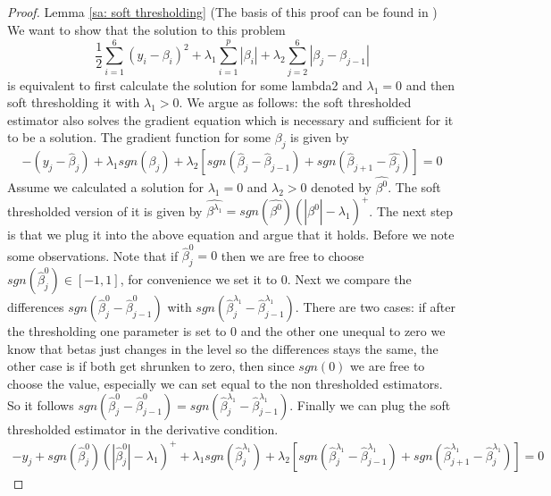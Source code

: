 \documentclass{article}
\theoremstyle{definition}
\begin{document}
\subsection{}

\begin{proof} Lemma \ref{sa: soft thresholding} (The basis of this proof can be found in \citep{friedman2007pathwise})
	We want  to show that the solution to this problem 
	\begin{equation}
	\frac{1}{2}  \sum_{i=1}^{6}(y_{i}-\beta_i)^2+\lambda_1\sum_{i=1}^p|\beta_i| + \lambda_2 \sum_{j=2}^6|\beta_j- \beta_{j-1} |
	\end{equation} is equivalent to first calculate the solution for some lambda2  and $\lambda_1 =0$ and then soft thresholding it with $\lambda_1>0$. We argue as follows: the soft thresholded estimator also solves the gradient equation which is necessary and sufficient for it to be a solution. The gradient function for some $\beta_j$ is given by
	\begin{equation}
	-(y_j-\hat{\beta}_j)+\lambda_1 sgn(\beta_j)+\lambda_2 [sgn(\hat{\beta}_j-\hat{\beta}_{j-1})+sgn(\hat{\beta}_{j+1}-\hat{\beta_j})]=0
	\end{equation}
	Assume we calculated a solution for $\lambda_1=0$ and $\lambda_2 > 0$ denoted by $\hat{\beta^0}$. The soft thresholded version of it is given by $\hat{\beta^{\lambda_1}}=sgn(\hat{\beta^0})(|\hat{\beta^0}|-\lambda_1)^{\text{+}}$. The next step is that we plug it into the above equation and argue that it holds. Before we note some observations. Note that if $\hat{\beta}^0_j=0$ then we are free to choose $sgn(\hat{\beta}^0_j) \in [-1,1]$, for convenience we set it to 0. Next we compare the differences $sgn(\hat{\beta}_j^0-\hat{\beta}_{j-1}^0)$ with $sgn(\hat{\beta}_j^{\lambda_1}-\hat{\beta}_{j-1}^{\lambda_1})$. There are two cases: if after the thresholding one parameter is set to 0 and the other one unequal to zero we know that betas just changes in the level so the differences stays the same, the other case is if both get shrunken to zero, then since $sgn(0)$ we are free to choose the value, especially we can set equal to the non thresholded estimators. So it follows $sgn(\hat{\beta}_j^0-\hat{\beta}_{j-1}^0)=sgn(\hat{\beta}_j^{\lambda_1}-\hat{\beta}_{j-1}^{\lambda_1})$. Finally we can plug the soft thresholded estimator in the derivative condition.
	\begin{align}
	-y_j+sgn(\hat{\beta}^0_j)(|\hat{\beta}_j^0|-\lambda_1)^{\text{+}}+\lambda_1 sgn(\hat{\beta}_j^{\lambda_1})+\lambda_2 [sgn(\hat{\beta}^{\lambda_1}_j-\hat{\beta}^{\lambda_1}_{j-1})+sgn(\hat{\beta}^{\lambda_1}_{j+1}-\hat{\beta}^{\lambda_1}_j)]=0

\end{align}
\end{proof}
\end{document}
